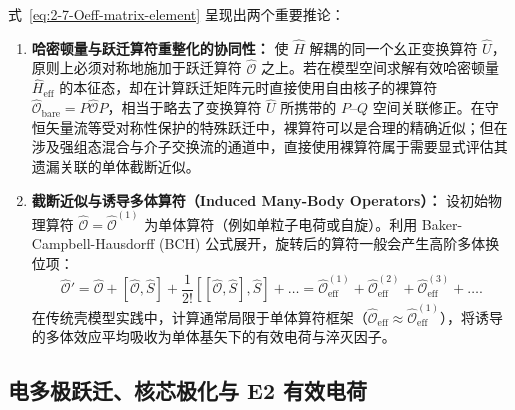 式~\eqref{eq:2-7-Oeff-matrix-element} 呈现出两个重要推论：
\begin{enumerate}
\item \textbf{哈密顿量与跃迁算符重整化的协同性：} 
使 $\hat{H}$ 解耦的同一个幺正变换算符 $\hat{U}$，原则上必须对称地施加于跃迁算符 $\hat{\mathcal{O}}$ 之上。若在模型空间求解有效哈密顿量 $\hat{H}_{\mathrm{eff}}$ 的本征态，却在计算跃迁矩阵元时直接使用自由核子的裸算符 $\hat{\mathcal{O}}_{\mathrm{bare}} = P \hat{\mathcal{O}} P$，相当于略去了变换算符 $\hat{U}$ 所携带的 $P\text{--}Q$ 空间关联修正。在守恒矢量流等受对称性保护的特殊跃迁中，裸算符可以是合理的精确近似；但在涉及强组态混合与介子交换流的通道中，直接使用裸算符属于需要显式评估其遗漏关联的单体截断近似。
\item \textbf{截断近似与诱导多体算符（Induced Many-Body Operators）：}
设初始物理算符 $\hat{\mathcal{O}} = \hat{\mathcal{O}}^{(1)}$ 为单体算符（例如单粒子电荷或自旋）。利用 Baker-Campbell-Hausdorff (BCH) 公式展开，旋转后的算符一般会产生高阶多体换位项：
\begin{equation}\label{eq:2-7-BCH-expansion}
\hat{\mathcal{O}}' = \hat{\mathcal{O}} + [\hat{\mathcal{O}}, \hat{S}] + \frac{1}{2!} [[\hat{\mathcal{O}}, \hat{S}], \hat{S}] + \dots = \hat{\mathcal{O}}^{(1)}_{\mathrm{eff}} + \hat{\mathcal{O}}^{(2)}_{\mathrm{eff}} + \hat{\mathcal{O}}^{(3)}_{\mathrm{eff}} + \dots.
\end{equation}
在传统壳模型实践中，计算通常局限于单体算符框架（$\hat{\mathcal{O}}_{\mathrm{eff}} \approx \hat{\mathcal{O}}^{(1)}_{\mathrm{eff}}$），将诱导的多体效应平均吸收为单体基矢下的有效电荷与淬灭因子。
\end{enumerate}

\subsection{电多极跃迁、核芯极化与 E2 有效电荷}\label{sec:2-7-2}

